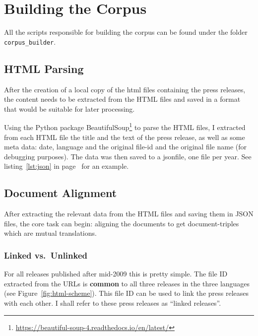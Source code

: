 \section{Building the Corpus}
All the scripts responsible for building the corpus can be found under the folder \texttt{corpus\_builder}.

\subsection{HTML Parsing}
After the creation of a local copy of the \acrshort{html} files containing the press releases, the content needs to be extracted from the HTML files and saved in a format that would be suitable for later processing.

Using the Python package BeautifulSoup\footnote{\url{https://beautiful-soup-4.readthedocs.io/en/latest/}} to parse the HTML files, I extracted from each HTML file the title and the text of the press release, as well as some meta data: date, language and the original file-id and the original file name (for debugging purposes).  
The data was then saved to a \gls{json}\footnotemark file, one file per year.
See listing~\ref{lst:json} in page~\pageref{lst:json} for an example.




\subsection{Document Alignment}
After extracting the relevant data from the HTML files and saving them in \acrshort{JSON} files, the core task can begin: aligning the documents to get document-triples which are mutual translations.

\subsubsection{Linked vs.~Unlinked}
\label{sec:linked-unlinked}
For all releases published after mid-2009 this is pretty simple. 
The file ID extracted from the URLs is \textbf{common} to all three releases in the three languages (see Figure~\ref{fig:html-scheme}). 
This file ID can be used to link the press releases with each other. 
I shall refer to these press releases as \enquote{linked releases}.


